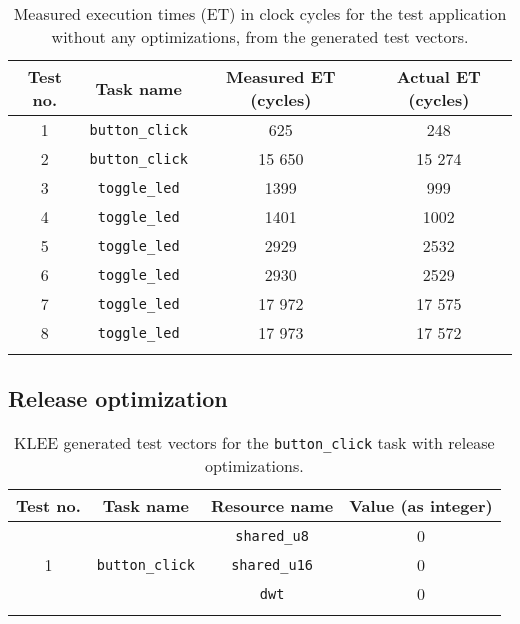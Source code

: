 \begin{longtable}{|c | c | c | c|}
    \hline
    Test no. & Task name & Measured ET (cycles) & Actual ET (cycles) \\ [0.5ex]
    \hline
    1 & \texttt{button\_click} & 625 & 248 \\
    \hline
    2 & \texttt{button\_click} & 15 650 & 15 274 \\
    \hline
    3 & \texttt{toggle\_led} & 1399 & 999  \\
    \hline
    4 & \texttt{toggle\_led} & 1401  & 1002 \\
    \hline
    5 & \texttt{toggle\_led} & 2929  & 2532 \\
    \hline
    6 & \texttt{toggle\_led} & 2930 & 2529 \\
    \hline
    7 & \texttt{toggle\_led} & 17 972 & 17 575 \\
    \hline
    8 & \texttt{toggle\_led} & 17 973 & 17 572 \\
    \hline
\caption{Measured execution times (ET) in clock cycles for the test application without any optimizations, from the generated test vectors.}
\label{tab:evaldebugmeasure}
\end{longtable}

\subsection{Release optimization}

\begin{longtable}{|c|c|c|c|}
\hline
Test no. & Task name & Resource name & Value (as integer) \\ \hline
\multirow{3}{*}{1} & \multirow{3}{*}{\texttt{button\_click}} & \texttt{shared\_u8}  & 0 \\ \cline{3-4}
                   &                                         & \texttt{shared\_u16} & 0 \\ \cline{3-4}
                   &                                         & \texttt{dwt}         & 0 \\ \hline
\caption{KLEE generated test vectors for the \texttt{button\_click} task with release optimizations.}
\label{tab:evalreleasetestsbutton}
\end{longtable}

